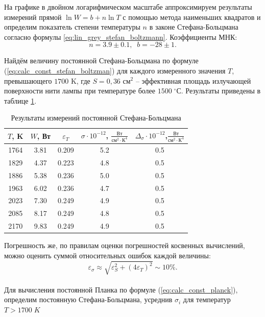 \documentclass[a4paper, 12pt]{article}
\newcommand{\cels}{\; ^\circ С}
\begin{document}
    На графике в двойном логарифмическом масштабе аппроксимируем результаты измерений прямой $\ln W = b + n \ln T$ с помощью метода наименьших квадратов и определим показатель степени температуры $n$ в законе Стефана-Больцмана согласно формулы \ref{eq:lin_grey_stefan_boltzmann}. Коэффициенты МНК: \\
    $$n = 3.9 \pm 0.1,\;\; b = -28 \pm 1.$$

    Найдём величину постоянной Стефана-Больцмана по формуле (\ref{eq:calc_const_stefan_boltzman}) для каждого измеренного значения $T$, превышающего $1700$ K, где $S = 0,36 \text{ см}^2$ -- эффективная площадь излучающей поверхности нити лампы при температуре более $1500 \cels$. Результаты приведены в таблице \ref{table:calc_const_stefan_boltzman}.

     \begin{table}[H]
        \centering
        \footnotesize
        \begin{tabular}{ccccc}
            \toprule
            $T$, K & $W$, Вт & $\varepsilon_T$ & $\sigma \cdot 10^{-12}$, $\frac{\text{Вт}}{\text{см}^2 \cdot \text{К}^4}$ & $\Delta_\sigma \cdot 10^{-12}$,$ \frac{\text{Вт}}{\text{см}^2 \cdot \text{К}^4}$ \\
            \midrule
            1764 & 3.81 & 0.209 & 5.2 & 0.5 \\
            1829 & 4.37 & 0.223 & 4.8 & 0.5 \\
            1886 & 5.38 & 0.236 & 5.0 & 0.5 \\
            1963 & 6.02 & 0.236 & 4.7 & 0.5 \\
            2023 & 7.30 & 0.249 & 4.9 & 0.5 \\
            2085 & 8.17 & 0.249 & 4.8 & 0.5 \\
            2170 & 9.83 & 0.249 & 4.9 & 0.5 \\
            \bottomrule
        \end{tabular}
        \caption{Результаты измерений постоянной Стефана-Больцмана}
	\label{table:calc_const_stefan_boltzman}
    \end{table}

    Погрешность же, по правилам оценки погрешностей косвенных вычислений, можно оценить суммой относительных ошибок каждой величины:
    $$\varepsilon_\sigma \approx \sqrt{\varepsilon_S^2 + (4\varepsilon_T)^2} \sim 10 \%. $$\\

    Для вычисления постоянной Планка по формуле (\ref{eq:calc_const_planck}), определим постоянную Стефана-Больцмана, усреднив $\sigma_i$ для температур $T > 1700\; K$
    
\end{document}
